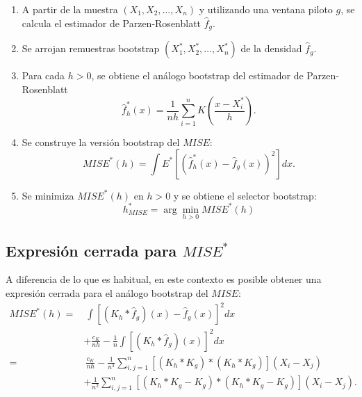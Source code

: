 \documentclass[]{book}
\theoremstyle{definition}
\theoremstyle{definition}
\theoremstyle{definition}
\theoremstyle{remark}
\begin{document}
\begin{enumerate}
\def\labelenumi{\arabic{enumi}.}
\item
  A partir de la muestra \(\left( X_1,X_2,\ldots ,X_n \right)\) y
  utilizando una ventana piloto \(g\), se calcula el estimador de
  Parzen-Rosenblatt \(\hat{f}_{g}\).
\item
  Se arrojan remuestras bootstrap
  \(\left( X_1^{\ast},X_2^{\ast },\ldots ,X_n^{\ast} \right)\) de la
  densidad \(\hat{f}_{g}\).
\item
  Para cada \(h>0\), se obtiene el análogo bootstrap del estimador de
  Parzen-Rosenblatt
  \[\hat{f}_{h}^{\ast}\left( x \right) =\frac{1}{nh}\sum_{i=1}^{n}K\left( \frac{
  x-X_i^{\ast}}{h} \right).\]
\item
  Se construye la versión bootstrap del
  \(MISE\):\[MISE^{\ast}\left( h \right) =\int E^{\ast}\left[ \left( \hat{f}_{h}^{\ast
  }\left( x \right) -\hat{f}_{g}\left( x \right) \right)^2\right] dx.\]
\item
  Se minimiza \(MISE^{\ast}\left( h \right)\) en \(h>0\) y se obtiene el
  selector bootstrap:
  \[h_{MISE}^{\ast}=\arg \min_{h>0}MISE^{\ast}\left( h \right)\]
\end{enumerate}

\subsection{\texorpdfstring{Expresión cerrada para
\(MISE^{\ast}\)}{Expresión cerrada para MISE\^{}\{\textbackslash{}ast\}}}\label{expresion-cerrada-para-miseast}

A diferencia de lo que es habitual, en este contexto es posible obtener
una expresión cerrada para el análogo bootstrap del \(MISE\):
\[\begin{aligned}
MISE^{\ast}\left( h \right) =&\ \int \left[ \left( K_{h}\ast 
\hat{f}_{g} \right) \left( x \right) -\hat{f}_{g}\left( x \right) \right]^2dx \\
&+\frac{c_{K}}{nh}-\frac{1}{n}\int \left[ \left( K_{h}\ast 
\hat{f}_{g} \right) \left( x \right) \right]^2dx \\
=&\ \frac{c_{K}}{nh}-\frac{1}{n^{3}}\sum_{i,j=1}^{n}\left[ \left( K_{h}\ast
K_{g} \right) \ast \left( K_{h}\ast K_{g} \right) \right] \left(
X_i-X_j \right) \\
&+\frac{1}{n^2}\sum_{i,j=1}^{n}\left[ \left( K_{h}\ast K_{g}-K_{g} \right)
\ast \left( K_{h}\ast K_{g}-K_{g} \right) \right] \left( X_i-X_j \right).\end{aligned}\]
\end{document}
